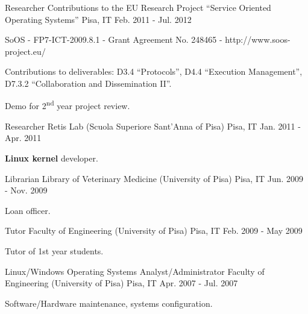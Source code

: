 \begin{cventries}
  \cventry
    {Researcher} %
    {Contributions to the EU Research Project “Service Oriented Operating Systems”} %
    {Pisa, IT} %
    {Feb. 2011 - Jul. 2012} %
    {
      \begin{cvitems} %
	\item {SoOS - FP7-ICT-2009.8.1 - Grant Agreement No. 248465 - http://www.soos-project.eu/} %
	\item {Contributions to deliverables: D3.4 “Protocols”, D4.4 “Execution Management”, D7.3.2
	       “Collaboration and Dissemination II”.}
       \item {Demo for 2\textsuperscript{nd} year project review.}
      \end{cvitems}
    }

  \cventry
    {Researcher} %
    {Retis Lab (Scuola Superiore Sant'Anna of Pisa)} %
    {Pisa, IT} %
    {Jan. 2011 - Apr. 2011} %
    {
      \begin{cvitems} %
	\item {\textbf{Linux kernel} developer.}
      \end{cvitems}
    }

  \cventry
    {Librarian} %
    {Library of Veterinary Medicine (University of Pisa)} %
    {Pisa, IT} %
    {Jun. 2009 - Nov. 2009} %
    {
      \begin{cvitems} %
	\item {Loan officer.}
      \end{cvitems}
    }

  \cventry
    {Tutor} %
    {Faculty of Engineering (University of Pisa)} %
    {Pisa, IT} %
    {Feb. 2009 - May 2009} %
    {
      \begin{cvitems} %
	\item {Tutor of 1st year students.}
      \end{cvitems}
    }

  \cventry
    {Linux/Windows Operating Systems Analyst/Administrator} %
    {Faculty of Engineering (University of Pisa)} %
    {Pisa, IT} %
    {Apr. 2007 - Jul. 2007} %
    {
      \begin{cvitems} %
	\item {Software/Hardware maintenance, systems configuration.}
      \end{cvitems}
    }


\end{cventries}
